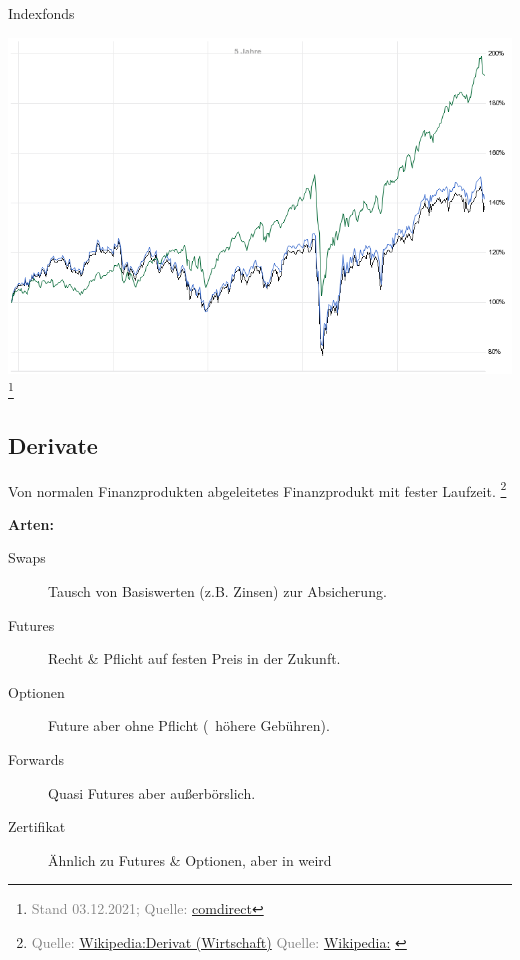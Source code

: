\documentclass{beamer}
\let\oldfootnote\footnote
\renewcommand{\footnote}[1]
{%
	\oldfootnote
	{
		\tiny
		\textcolor{gray}{#1}
	}%
}
\newcommand{\citewiki}[2][]
{%
	\footnote
	{
		\ifthenelse{\isempty{#1}}
		{
			Quelle: \href{https://de.wikipedia.org/wiki/#2}{Wikipedia:#2}
		}
		{
			Quelle: \href{https://de.wikipedia.org/wiki/#2}{Wikipedia:#1}
		}
	}
}
\begin{document}
			\begin{frame}{Indexfonds}
				\begin{center}
					\includegraphics[height=0.8\textheight,trim=0 0 0 0.5cm]{images/dax-etf-benchmark}\footnote{Stand 03.12.2021; Quelle: \href{https://charts.comdirect.de/charts/benchmark_underlying.chart?HEIGHT=128&HEIGHT=600&ID_BENCH1=20735&ID_BENCH2=12221463&ID_NOTATION=28520649&TIME_SPAN=5Y&WIDTH=800}{comdirect}}
				\end{center}
			\end{frame}
		
		\subsection{Derivate}
		
			\begin{frame}
				\begin{definition}
					Von normalen Finanzprodukten abgeleitetes Finanzprodukt mit fester Laufzeit.\citewiki{Derivat (Wirtschaft)}
				\end{definition}
				\textbf{Arten:}
				\begin{description}
					\item[Swaps] Tausch von Basiswerten (z.B. Zinsen) zur Absicherung.
					\item[Futures] Recht \& Pflicht auf festen Preis in der Zukunft.
					\item[Optionen] Future aber ohne Pflicht (\textrightarrow\ höhere Gebühren).
					\item[Forwards] Quasi Futures aber außerbörslich.
					\item[Zertifikat] Ähnlich zu Futures \& Optionen, aber in weird
				\end{description}
			\end{frame}
		
\end{document}
